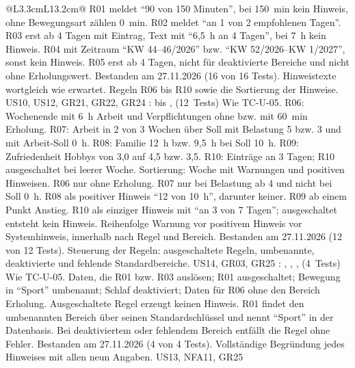 \begin{longtable}{@{}L{3.3cm}L{13.2cm}@{}}
    {R01 meldet \enquote{90 von 150 Minuten}, bei 150~min kein Hinweis, ohne Bewegungsart zählen 0~min. R02 meldet \enquote{an 1 von 2 empfohlenen Tagen}. R03 erst ab 4 Tagen mit Eintrag, Text mit \enquote{6,5~h an 4 Tagen}, bei 7~h kein Hinweis. R04 mit Zeitraum \enquote{KW 44--46/2026} bzw. \enquote{KW 52/2026--KW 1/2027}, sonst kein Hinweis. R05 erst ab 4 Tagen, nicht für deaktivierte Bereiche und nicht ohne Erholungswert.}
    {Bestanden am 27.11.2026 (16 von 16 Tests). Hinweistexte wortgleich wie erwartet.}
  \midrule
    {Regeln R06 bis R10 sowie die Sortierung der Hinweise.}
    {US10, US12, GR21, GR22, GR24}
    {:  bis ,  (12~Tests)}
    {Wie TC-U-05.}
    {R06: Wochenende mit 6~h Arbeit und Verpflichtungen ohne bzw. mit 60~min Erholung. R07: Arbeit in 2 von 3 Wochen über Soll mit Belastung 5 bzw. 3 und mit Arbeit-Soll 0~h. R08: Familie 12~h bzw. 9,5~h bei Soll 10~h. R09: Zufriedenheit Hobbys von 3,0 auf 4,5 bzw. 3,5. R10: Einträge an 3 Tagen; R10 ausgeschaltet bei leerer Woche. Sortierung: Woche mit Warnungen und positiven Hinweisen.}
    {R06 nur ohne Erholung. R07 nur bei Belastung ab 4 und nicht bei Soll 0~h. R08 als positiver Hinweis \enquote{12 von 10~h}, darunter keiner. R09 ab einem Punkt Anstieg. R10 als einziger Hinweis mit \enquote{an 3 von 7 Tagen}; ausgeschaltet entsteht kein Hinweis. Reihenfolge Warnung vor positivem Hinweis vor Systemhinweis, innerhalb nach Regel und Bereich.}
    {Bestanden am 27.11.2026 (12 von 12 Tests).}
  \midrule
    {Steuerung der Regeln: ausgeschaltete Regeln, umbenannte, deaktivierte und fehlende Standardbereiche.}
    {US14, GR03, GR25}
    {: , , ,  (4~Tests)}
    {Wie TC-U-05.}
    {Daten, die R01 bzw. R03 auslösen; R01 ausgeschaltet; Bewegung in \enquote{Sport} umbenannt; Schlaf deaktiviert; Daten für R06 ohne den Bereich Erholung.}
    {Ausgeschaltete Regel erzeugt keinen Hinweis. R01 findet den umbenannten Bereich über seinen Standardschlüssel und nennt \enquote{Sport} in der Datenbasis. Bei deaktiviertem oder fehlendem Bereich entfällt die Regel ohne Fehler.}
    {Bestanden am 27.11.2026 (4 von 4 Tests).}
  \midrule
    {Vollständige Begründung jedes Hinweises mit allen neun Angaben.}
    {US13, NFA11, GR25}

\end{longtable}
